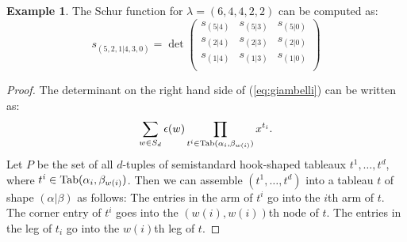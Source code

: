 \documentclass[11pt]{amsart}
\theoremstyle{definition}
\theoremstyle{example}
\newtheorem{example}[theorem]{Example}
\newcommand{\Tab}{\textup{Tab}}
\begin{document}
\begin{example}
  The Schur function for $\lambda=(6,4,4,2,2)$ can be computed as:
  \begin{displaymath}
    s_{(5,2,1|4,3,0)} = \det
    \begin{pmatrix}
      s_{(5|4)} & s_{(5|3)} & s_{(5|0)}\\
      s_{(2|4)} & s_{(2|3)} & s_{(2|0)}\\
      s_{(1|4)} & s_{(1|3)} & s_{(1|0)}\\
    \end{pmatrix}
  \end{displaymath}
\end{example}
\begin{proof}
  The determinant on the right hand side of (\ref{eq:giambelli}) can be written as:
  \begin{equation}
    \label{eq:giambelli-det}
    \sum_{w\in S_d} \epsilon(w) \prod_{t^i\in \Tab(\alpha_i,\beta_{w(i)})} x^{t_i}.
  \end{equation}
  Let $P$ be the set of all $d$-tuples of semistandard hook-shaped tableaux $t^1,\dotsc,t^d$, where $t^i\in \Tab(\alpha_i,\beta_{w(i)})$.
  Then we can assemble $(t^1,\dotsc,t^d)$ into a tableau $t$ of shape $(\alpha|\beta)$ as follows:
  The entries in the arm of $t^i$ go into the $i$th arm of $t$.
  The corner entry of $t^i$ goes into the $(w(i),w(i))$th node of $t$.
  The entries in the leg of $t_i$ go into the $w(i)$th leg of $t$.
\end{proof}
\end{document}
